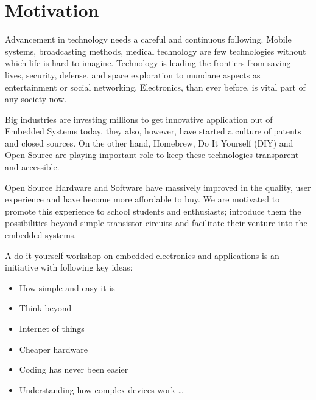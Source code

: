 \documentclass[12pt]{article} %
\begin{document}



\section{Motivation} %
Advancement in technology needs a careful and continuous following. Mobile systems, broadcasting methods, medical technology are few technologies without which life is hard to imagine. Technology is leading the frontiers from saving lives, security, defense, and space exploration to mundane aspects as entertainment or social networking. Electronics, than ever before, is vital part of any society now.\vspace{1mm}

Big industries are investing millions to get innovative application out of Embedded Systems today, they also, however, have started a culture of patents and closed sources. On the other hand, Homebrew, Do It Yourself (DIY) and Open Source are playing important role to keep these technologies transparent and accessible. \vspace{1mm}

Open Source Hardware and Software have massively improved in the quality, user experience and have become more affordable to buy. We are motivated to promote this experience to school students and enthusiasts; introduce them the possibilities beyond simple transistor circuits and facilitate their venture into the embedded systems.\vspace{1mm}

A do it yourself workshop on embedded electronics and applications is an initiative with following key ideas:

\begin{itemize}
\item How simple and easy it is
\item Think beyond
\item Internet of things
\item Cheaper hardware
\item Coding has never been easier
\item Understanding how complex devices work \ldots
\end{itemize}
\end{document}
